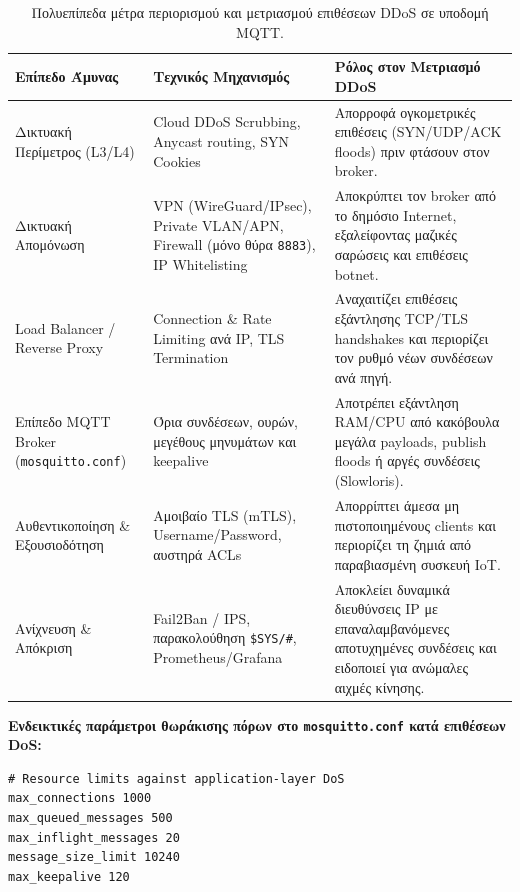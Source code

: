 \documentclass[11pt, a4paper]{article}
\begin{document}
\begin{table}[h]
\centering
\caption{Πολυεπίπεδα μέτρα περιορισμού και μετριασμού επιθέσεων DDoS σε υποδομή MQTT.}
\label{tab:ddos}
\vspace{4pt}
\begin{tabularx}{\textwidth}{>{\raggedright\arraybackslash}p{3.4cm} >{\raggedright\arraybackslash}p{4.4cm} >{\raggedright\arraybackslash}X}
\toprule
\textbf{Επίπεδο Άμυνας} & \textbf{Τεχνικός Μηχανισμός} & \textbf{Ρόλος στον Μετριασμό DDoS} \\
\midrule
Δικτυακή Περίμετρος (L3/L4) & Cloud DDoS Scrubbing, Anycast routing, SYN Cookies & Απορροφά ογκομετρικές επιθέσεις (SYN/UDP/ACK floods) πριν φτάσουν στον broker. \\
\addlinespace
Δικτυακή Απομόνωση & VPN (WireGuard/IPsec), Private VLAN/APN, Firewall (μόνο θύρα \texttt{8883}), IP Whitelisting & Αποκρύπτει τον broker από το δημόσιο Internet, εξαλείφοντας μαζικές σαρώσεις και επιθέσεις botnet. \\
\addlinespace
Load Balancer / Reverse Proxy & Connection \& Rate Limiting ανά IP, TLS Termination & Αναχαιτίζει επιθέσεις εξάντλησης TCP/TLS handshakes και περιορίζει τον ρυθμό νέων συνδέσεων ανά πηγή. \\
\addlinespace
Επίπεδο MQTT Broker (\texttt{mosquitto.conf}) & Όρια συνδέσεων, ουρών, μεγέθους μηνυμάτων και keepalive & Αποτρέπει εξάντληση RAM/CPU από κακόβουλα μεγάλα payloads, publish floods ή αργές συνδέσεις (Slowloris). \\
\addlinespace
Αυθεντικοποίηση \& Εξουσιοδότηση & Αμοιβαίο TLS (mTLS), Username/Password, αυστηρά ACLs & Απορρίπτει άμεσα μη πιστοποιημένους clients και περιορίζει τη ζημιά από παραβιασμένη συσκευή IoT. \\
\addlinespace
Ανίχνευση \& Απόκριση & Fail2Ban / IPS, παρακολούθηση \texttt{\$SYS/\#}, Prometheus/Grafana & Αποκλείει δυναμικά διευθύνσεις IP με επαναλαμβανόμενες αποτυχημένες συνδέσεις και ειδοποιεί για ανώμαλες αιχμές κίνησης. \\
\bottomrule
\end{tabularx}
\end{table}

\textbf{Ενδεικτικές παράμετροι θωράκισης πόρων στο \texttt{mosquitto.conf} κατά επιθέσεων DoS:}
\begin{lstlisting}[language={}]
# Resource limits against application-layer DoS
max_connections 1000
max_queued_messages 500
max_inflight_messages 20
message_size_limit 10240
max_keepalive 120
\end{lstlisting}
\end{document}
